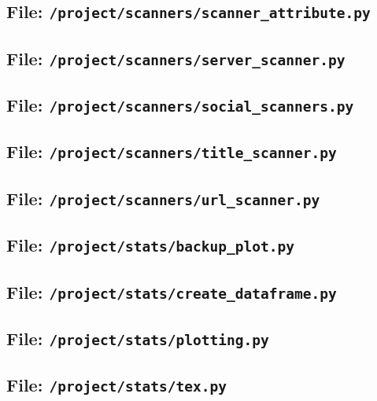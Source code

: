\subsection{File: \texttt{/project/scanners/scanner\_attribute.py}}
\subsection{File: \texttt{/project/scanners/server\_scanner.py}}
\subsection{File: \texttt{/project/scanners/social\_scanners.py}}
\subsection{File: \texttt{/project/scanners/title\_scanner.py}}
\subsection{File: \texttt{/project/scanners/url\_scanner.py}}
\subsection{File: \texttt{/project/stats/backup\_plot.py}}
\subsection{File: \texttt{/project/stats/create\_dataframe.py}}
\subsection{File: \texttt{/project/stats/plotting.py}}
\subsection{File: \texttt{/project/stats/tex.py}}
